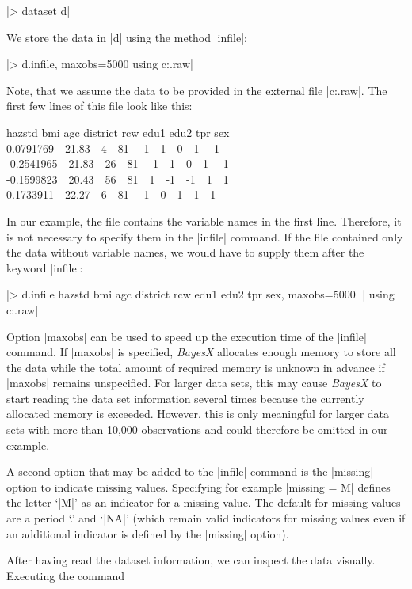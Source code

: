 |> dataset d|

We store the data in |d| using the method |infile|:

|> d.infile, maxobs=5000 using c:\data\zambia.raw|

Note, that we assume the data to be provided in the external file |c:\data\zambia.raw|. The first few lines of this file look
like this:

{\footnotesize
 hazstd bmi agc district rcw edu1 edu2 tpr sex\\
 0.0791769 \,\, 21.83 \,\, 4 \,\, 81 \,\, -1 \,\, 1 \,\, 0 \,\, 1 \,\, -1\\
 -0.2541965 \,\, 21.83 \,\, 26 \,\, 81 \,\, -1 \,\, 1 \,\, 0 \,\, 1 \,\, -1\\
 -0.1599823 \,\, 20.43 \,\, 56 \,\, 81 \,\, 1 \,\, -1 \,\, -1 \,\, 1 \,\, 1\\
 0.1733911 \,\, 22.27 \,\, 6 \,\, 81 \,\, -1 \,\, 0 \,\, 1 \,\, 1 \,\, 1}

In our example, the file contains the variable names in the first line. Therefore, it is not necessary to specify them in the
|infile| command. If the file contained only the data without variable names, we would have to supply them after the keyword
|infile|:

 |> d.infile hazstd bmi agc district rcw edu1 edu2 tpr sex, maxobs=5000|
 |  using c:\data\zambia.raw|

Option |maxobs| can be used to speed up the execution time of the |infile| command. If |maxobs| is specified, {\it BayesX}
allocates enough memory to store all the data while the total amount of required memory is unknown in advance if |maxobs|
remains unspecified. For larger data sets, this may cause {\it BayesX} to start reading the data set information several times
because the currently allocated memory is exceeded. However, this is only meaningful for larger data sets with more than 10,000
observations and could therefore be omitted in our example.

A second option that may be added to the |infile| command is the |missing| option to indicate missing values. Specifying for
example |missing = M| defines the letter `|M|' as an indicator for a missing value. The default for missing values are a period
`.' and `|NA|' (which remain valid indicators for missing values even if an additional indicator is defined by the |missing|
option).

After having read the dataset information, we can inspect the data visually. Executing the command

